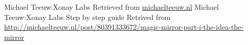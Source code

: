 \documentclass[conference]{IEEEtran}
\begin{document}

%
%
%
\begin{thebibliography}{1}

 Michael Teeuw:Xonay Labs Retrieved from \href{michaelteeuw.nl}{michaelteeuw.nl}
 Michael Teeuw:Xonay Labs Step by step guide Retrived from \href{http://michaelteeuw.nl/post/80391333672/magic-mirror-part-i-the-idea-the-mirror}{http://michaelteeuw.nl/post/80391333672/magic-mirror-part-i-the-idea-the-mirror}


\end{thebibliography}
\end{document}
